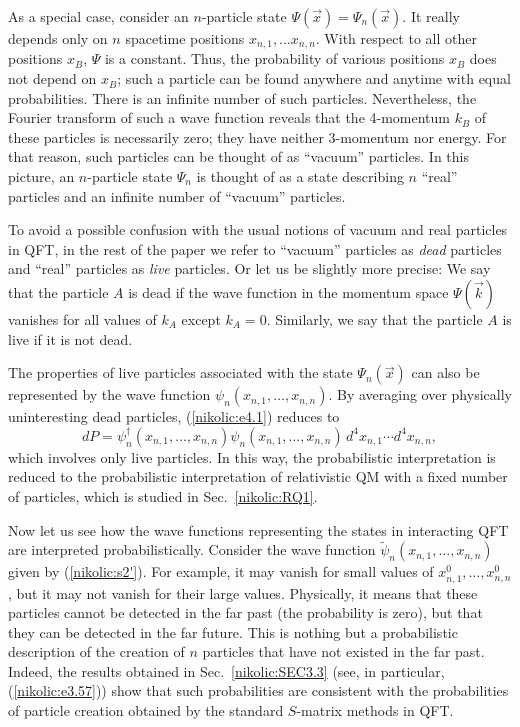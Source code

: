 \documentclass[12pt,twoside]{report} %
\begin{document}
As a special case, consider an $n$-particle state
$\Psi(\vec{x})=\Psi_n(\vec{x})$. It really depends only on
$n$ spacetime positions $x_{n,1},\ldots x_{n,n}$. With respect to
all other positions $x_B$, $\Psi$ is a constant. Thus, the probability
of various positions  $x_B$ does not depend on $x_B$; such a particle can be found
anywhere and anytime with equal probabilities. There is an infinite number of such
particles. Nevertheless, the Fourier transform of such a wave function reveals
that the 4-momentum $k_B$ of these particles is necessarily zero; they have neither
3-momentum nor energy. For that reason, such particles can be thought of as ``vacuum'' particles. 
In this picture, an $n$-particle state $\Psi_n$ is thought of as a state describing
$n$ ``real'' particles and an infinite number of ``vacuum'' particles.

To avoid a possible confusion with the usual notions of vacuum  
and real particles in QFT, in the rest of the paper
we refer to ``vacuum'' particles as {\it dead} particles
and ``real'' particles as {\it live} particles. Or let us be 
slightly more precise: We say that the 
particle $A$ is dead if the wave function in the momentum space
$\Psi(\vec{k})$ vanishes for all values of $k_A$ except $k_A=0$.
Similarly, we say that the particle $A$ is live if it is not dead.

The properties of live particles associated with the state $\Psi_n(\vec{x})$ can also be 
represented by the wave function $\psi_n(x_{n,1},\ldots,x_{n,n} )$. By averaging over
physically uninteresting dead particles, (\ref{nikolic:e4.1}) reduces to
 \begin{equation}\label{nikolic:e4.2}
 dP  =  \psi_n^{\dagger}(x_{n,1},\ldots,x_{n,n}) \psi_n(x_{n,1},\ldots,x_{n,n})
 \, d^4x_{n,1}\cdots d^4x_{n,n},
\end{equation}
which involves only live particles. In this way, the probabilistic 
interpretation is reduced to the probabilistic interpretation of relativistic
QM with a fixed number of particles, which is studied in Sec.~\ref{nikolic:RQ1}. 


Now let us see how the wave functions representing the states in interacting QFT are interpreted
probabilistically. Consider the wave function $\tilde{\psi}_n(x_{n,1},\ldots,x_{n,n})$
given by (\ref{nikolic:s2'}). For example, it may vanish for small values of 
$x^0_{n,1}, \dots, x^0_{n,n}$, but it may not vanish for their large values. Physically, it means
that these particles cannot be detected in the far past (the probability is zero), but that
they can be detected in the far future. This is nothing but a probabilistic description of
the creation of $n$ particles that have not existed in the far past. Indeed, 
the results obtained in Sec.~\ref{nikolic:SEC3.3} (see, in particular, (\ref{nikolic:e3.57}))
show that such probabilities are consistent with the probabilities of particle creation obtained
by the standard $S$-matrix methods in QFT.
\end{document}
